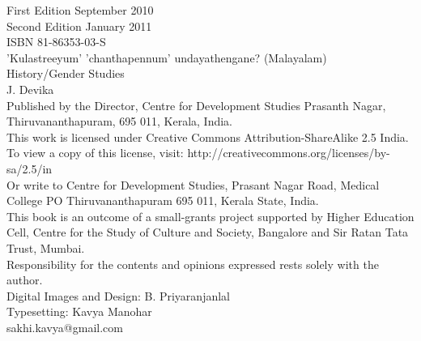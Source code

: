 
\noindent First Edition September 2010 \\

\noindent Second Edition January 2011 \\

\noindent ISBN 81-86353-03-S \\

\noindent 'Kulastreeyum' 'chanthapennum' undayathengane? (Malayalam) \\



\noindent	History/Gender Studies\\

\noindent	J. Devika \\

\noindent Published by the Director, Centre for Development Studies
Prasanth Nagar, Thiruvananthapuram, 695 011, Kerala, India. \\

\noindent This work is licensed under Creative Commons Attribution-ShareAlike 2.5 India.\\
\noindent To view a copy of this license, visit: {http://creativecommons.org/licenses/by-sa/2.5/in} \\
\noindent Or write to Centre for Development Studies, Prasant Nagar Road, Medical College PO
Thiruvananthapuram 695 011, Kerala State, India. \\

\noindent This book is an outcome of a small-grants project supported by
Higher Education Cell, Centre for the Study of Culture and Society, Bangalore and
Sir Ratan Tata Trust, Mumbai. \\

\noindent Responsibility for the contents and opinions expressed rests solely with the author. \\

\noindent Digital Images and Design: B. Priyaranjanlal \\

\noindent Typesetting: Kavya Manohar \\sakhi.kavya@gmail.com